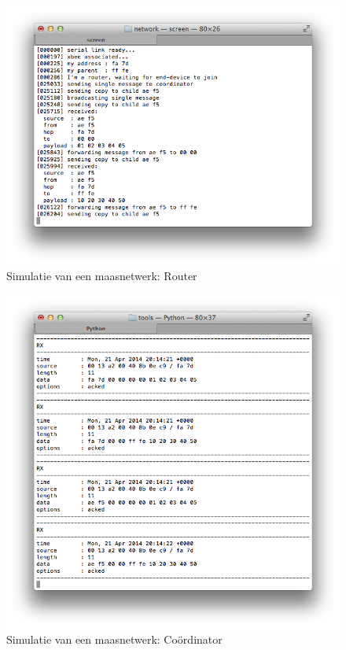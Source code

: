 \begin{figure}[ht]
  \centering
  \includegraphics[width=.7\linewidth]{../src/demo/network/router.png}
  \vspace{-3mm}
  \caption{Simulatie van een maasnetwerk: Router}
  \label{fig:virtual-mesh-router}
\end{figure}

\begin{figure}[ht]
  \centering
  \includegraphics[width=.7\linewidth]{../src/demo/network/coordinator.png}
  \vspace{-3mm}
  \caption{Simulatie van een maasnetwerk: Co\"ordinator}
  \label{fig:virtual-mesh-coordinator}
\end{figure}
